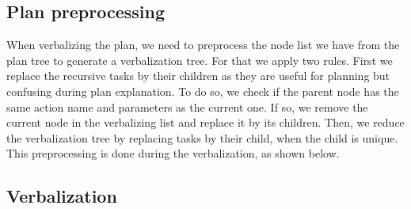 \documentclass{llncs}
\begin{document}



\subsection{Plan preprocessing}
\label{preprocess}
When verbalizing the plan, we need to preprocess the node list we have from the plan tree to generate a verbalization tree.
For that we apply two rules.
First we replace the recursive tasks by their children as they are useful for planning but confusing during plan explanation. To do so, we check if the parent node has the same action name and parameters as the current one. If so, we remove the current node in the verbalizing list and replace it by its children.
%
Then, we reduce the verbalization tree by replacing tasks by their child, when the child is unique.
%
%
This preprocessing is done during the verbalization, as shown below.


\subsection{Verbalization}
\end{document}
